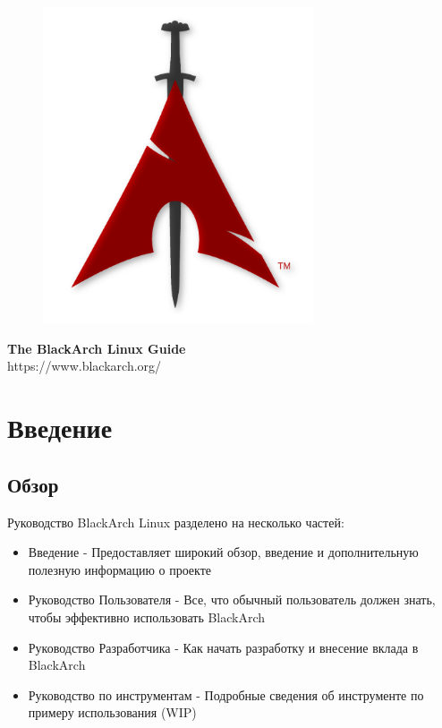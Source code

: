 \documentclass[a4paper, oneside, 11pt]{book}
\begin{document}
\pagestyle{empty}
\begin{center}
\begin{figure}[htbp]
\centering
\vspace{0.5cm}
\includegraphics[width=8cm]{images/logo.png}
\label{fig:logo}
\end{figure}
\vspace{0.5cm}
\Huge{\textbf{The BlackArch Linux Guide}}\\
\vspace{1cm}
\Large{\color{red}https://www.blackarch.org/}\\
\vspace{0.5cm}
\end{center}
\newpage
\tableofcontents
\newpage
\pagestyle{fancy}


\chapter{Введение}

\section{Обзор}
Руководство BlackArch Linux разделено на несколько частей:
\begin{itemize}
\item Введение - Предоставляет широкий обзор, введение и дополнительную полезную информацию о проекте
\item Руководство Пользователя - Все, что обычный пользователь должен знать, чтобы эффективно использовать BlackArch
\item Руководство Разработчика - Как начать разработку и внесение вклада в BlackArch
\item Руководство по инструментам - Подробные сведения об инструменте по примеру использования (WIP)
\end{itemize}
\end{document}
